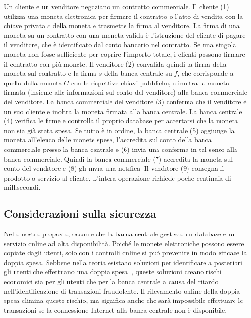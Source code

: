 \documentclass[a4paper]{article}
\begin{document}
Un cliente e un venditore negoziano un contratto commerciale. Il
cliente (1) utilizza una moneta elettronica per firmare il contratto o
l'atto di vendita con la chiave privata $c$ della moneta e trasmette la
firma al venditore. La firma di una moneta su un contratto con una
moneta valida è l'istruzione del cliente di pagare il venditore, che è
identificato dal conto bancario nel contratto. Se una singola moneta
non fosse sufficiente per coprire l'importo totale, i clienti possono
firmare il contratto con più monete. Il venditore (2) convalida quindi
la firma della moneta sul contratto e la firma $s$ della banca centrale
su $f$, che  corrisponde a quella della moneta $C$ con le rispettive
chiavi pubbliche, e inoltra la moneta firmata (insieme alle
informazioni sul conto del venditore) alla banca commerciale del
venditore. La banca commerciale del venditore (3) conferma che il
venditore è un suo cliente e inoltra la moneta firmata alla banca
centrale. La banca centrale (4) verifica le firme e controlla il
proprio database per accertarsi che la moneta non sia già stata spesa.
Se tutto è in ordine, la banca centrale (5) aggiunge la moneta
all'elenco delle monete spese, l'accredita sul conto della banca
commerciale presso la banca centrale e (6) invia una conferma in tal
senso alla banca commerciale. Quindi la banca commerciale (7)
accredita la moneta sul conto del venditore e (8) gli invia una
notifica. Il venditore (9) consegna il prodotto o servizio al cliente.
L'intera operazione richiede poche centinaia di millisecondi.

\hypertarget{considerazioni-sulla-sicurezza}{%
\subsection{Considerazioni sulla sicurezza}
\label{considerazioni-sulla-sicurezza}}

Nella nostra proposta, occorre che la banca centrale gestisca un
database e un servizio online ad alta disponibilità. Poiché le monete
elettroniche possono essere copiate dagli utenti, solo con i controlli
online si può prevenire in modo efficace la doppia spesa. Sebbene
nella teoria esistano soluzioni per identificare a posteriori gli
utenti che effettuano una doppia spesa~\cite[vedi][]{Chaum1990},
queste soluzioni creano rischi economici sia per gli utenti che per la
banca centrale a causa del ritardo nell'identificazione di
transazioni fraudolente. Il rilevamento online della doppia spesa
elimina questo rischio, ma significa anche che sarà impossibile
effettuare le transazioni se la connessione Internet alla banca
centrale non è disponibile.
\end{document}
